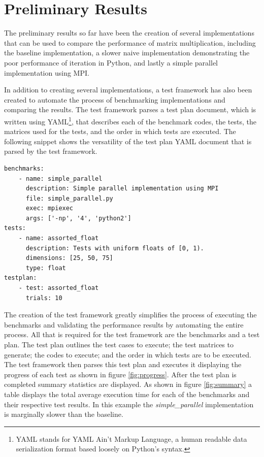 \documentclass[oneside]{article}
\begin{document}
\section{Preliminary Results}

The preliminary results so far have been the creation of several implementations that can be used to compare the performance of matrix multiplication, including the baseline implementation, a slower naive implementation demonstrating the poor performance of iteration in Python, and lastly a simple parallel implementation using MPI.

In addition to creating several implementations, a test framework has also been created to automate the process of benchmarking implementations and comparing the results. The test framework parses a test plan document, which is written using YAML\footnote{YAML stands for YAML Ain't Markup Language, a human readable data serialization format based loosely on Python's syntax.}, that describes each of the benchmark codes, the tests, the matrices used for the tests, and the order in which tests are executed. The following snippet shows the versatility of the test plan YAML document that is parsed by the test framework.


\singlespacing
\begin{verbatim}
benchmarks:
    - name: simple_parallel
      description: Simple parallel implementation using MPI
      file: simple_parallel.py
      exec: mpiexec
      args: ['-np', '4', 'python2']
tests:
    - name: assorted_float
      description: Tests with uniform floats of [0, 1).
      dimensions: [25, 50, 75]
      type: float
testplan:
    - test: assorted_float
      trials: 10
\end{verbatim}


\doublespacing
The creation of the test framework greatly simplifies the process of executing the benchmarks and validating the performance results by automating the entire process. All that is required for the test framework are the benchmarks and a test plan. The test plan outlines the test cases to execute; the test matrices to generate; the codes to execute; and the order in which tests are to be executed. The test framework then parses this test plan and executes it displaying the progress of each test as shown in figure \ref{fig:progress}. After the test plan is completed summary statistics are displayed. As shown in figure \ref{fig:summary} a table displays the total average execution time for each of the benchmarks and their respective test results. In this example the \emph{simple\_parallel} implementation is marginally slower than the baseline.
\end{document}
